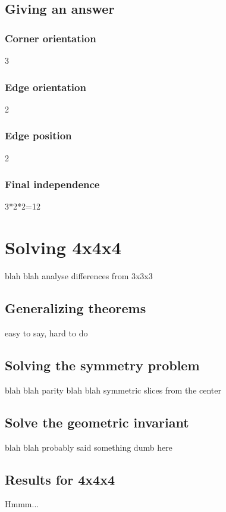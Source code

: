 \documentclass{article}
\begin{document}
        \subsection{Giving an answer}
            \subsubsection{Corner orientation}
                3

            \subsubsection{Edge orientation}
                2

            \subsubsection{Edge position}
                2

            \subsubsection{Final independence}
                3*2*2=12
    
    \section{Solving 4x4x4}
        blah blah analyse differences from 3x3x3

        \subsection{Generalizing theorems}
            easy to say, hard to do

        \subsection{Solving the symmetry problem}
            blah blah parity blah blah symmetric slices from the center
        
        \subsection{Solve the geometric invariant}
            blah blah probably said something dumb here

        \subsection{Results for 4x4x4}
            Hmmm...
\end{document}
